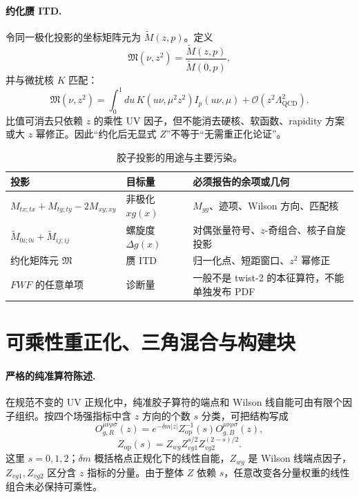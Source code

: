\paragraph{约化赝 ITD.}
令同一极化投影的坐标矩阵元为 \(\widetilde M(z,p)\)。定义
\begin{equation}
  \mathfrak M(\nu,z^2)
  =\frac{\widetilde M(z,p)}
         {\widetilde M(0,p)},
  \label{eq:b05-reduced-itd}
\end{equation}
并与微扰核 \(K\) 匹配：
\begin{equation}
  \mathfrak M(\nu,z^2)
  =\int_{0}^{1}du\,K(u\nu,\mu^2z^2)I_p(u\nu,\mu)
  +\mathcal O(z^2\Lambda_{\mathrm{QCD}}^2).
  \label{eq:b05-pseudo-factorization}
\end{equation}
比值可消去只依赖 \(z\) 的乘性 UV 因子，但不能消去硬核、软函数、rapidity 方案或大 \(z\) 幂修正。因此“约化后无显式 \(Z\)”不等于“无需重正化论证”。

\begin{table}[H]
  \centering
  \caption{胶子投影的用途与主要污染。}
  \label{tab:b05-projections}
  \small
  \begin{tabularx}{\textwidth}{@{}p{}p{}X@{}}
    \toprule
    投影 & 目标量 & 必须报告的余项或几何 \\
    \midrule
    \(M_{tx;tx}+M_{ty;ty}-2M_{xy;xy}\) & 非极化 \(xg(x)\) & \(M_{gg}\)、迹项、Wilson 方向、匹配核 \\
    \(\widetilde M_{0i;0i}+\widetilde M_{ij;ij}\) & 螺旋度 \(\Delta g(x)\) & 对偶张量符号、\(z\)-奇组合、核子自旋投影 \\
    约化矩阵元 \(\mathfrak M\) & 赝 ITD & 归一化点、短距窗口、\(z^2\) 幂修正 \\
    \(F W F\) 的任意单项 & 诊断量 & 一般不是 twist-2 的本征算符，不能单独发布 PDF \\
    \bottomrule
  \end{tabularx}
\end{table}

\section{可乘性重正化、三角混合与构建块}

\paragraph{严格的纯准算符陈述.}
在规范不变的 UV 正规化中，纯准胶子算符的端点和 Wilson 线自能可由有限个因子组织。按四个场强指标中含 \(z\) 方向的个数 \(s\) 分类，可把结构写成
\begin{equation}
  O_{g,R}^{\mu\nu\rho\sigma}(z)
  =e^{-\delta m|z|}Z_{\mathrm{op}}^{-1}(s)
   O_{g,B}^{\mu\nu\rho\sigma}(z),
  \label{eq:b05-multiplicative}
\end{equation}
\begin{equation}
  Z_{\mathrm{op}}(s)
  =Z_{wg}Z_{vg1}^{s/2}Z_{vg2}^{(2-s)/2}.
  \label{eq:b05-zop}
\end{equation}
这里 \(s=0,1,2\)；\(\delta m\) 概括格点正规化下的线性自能，\(Z_{wg}\) 是 Wilson 线端点因子，\(Z_{vg1},Z_{vg2}\) 区分含 \(z\) 指标的分量。由于整体 \(Z\) 依赖 \(s\)，任意改变各分量权重的线性组合未必保持可乘性。

